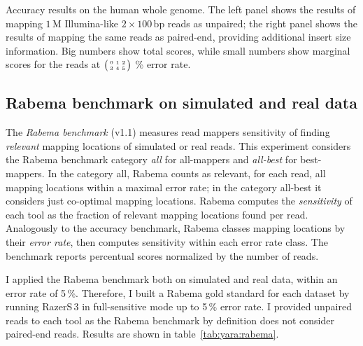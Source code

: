 \begin{table*}[t]
  \caption[Yara accuracy results]
  {
  \label{tab:yara:accuracy}
    Accuracy results on the human whole genome.
    The left panel shows the results of mapping $1\,\text{M}$ Illumina-like $2 \times 100\,\text{bp}$ reads as unpaired; the right panel shows the results of mapping the same reads as paired-end, providing additional insert size information.
    Big numbers show total scores, while small numbers show marginal scores for the reads at $\bigl(\begin{smallmatrix}\mbox{\tiny 0}&\mbox{\tiny 1}&\mbox{\tiny 2}\\\mbox{\tiny 3}&\mbox{\tiny 4}&\mbox{\tiny 5}\end{smallmatrix}\bigr)$ \% error rate.
    }
  \vspace{-3mm}
  \center
  \sffamily
  \resizebox{0.95\textwidth}{!}
  {
	\renewcommand{\tabcolsep}{0.8ex}
	
  }
\end{table*}


\subsection{Rabema benchmark on simulated and real data}

The \emph{Rabema benchmark} \citep{Holtgrewe2011} (v1.1) measures read mappers sensitivity of finding \emph{relevant} mapping locations of simulated or real reads.
This experiment considers the Rabema benchmark category \emph{all} for all-mappers and \emph{all-best} for best-mappers.
In the category all, Rabema counts as relevant, for each read, all mapping locations within a maximal error rate; in the category all-best it considers just co-optimal mapping locations.
Rabema computes the \emph{sensitivity} of each tool as the fraction of relevant mapping locations found per read.
Analogously to the accuracy benchmark, Rabema classes mapping locations by their \emph{error rate}, then computes sensitivity within each error rate class.
The benchmark reports percentual scores normalized by the number of reads.

I applied the Rabema benchmark both on simulated and real data, within an error rate of 5\,\%.
Therefore, I built a Rabema gold standard for each dataset by running RazerS\,3 in full-sensitive mode up to 5\,\% error rate.
I provided unpaired reads to each tool as the Rabema benchmark by definition does not consider paired-end reads.
Results are shown in table~\ref{tab:yara:rabema}.

